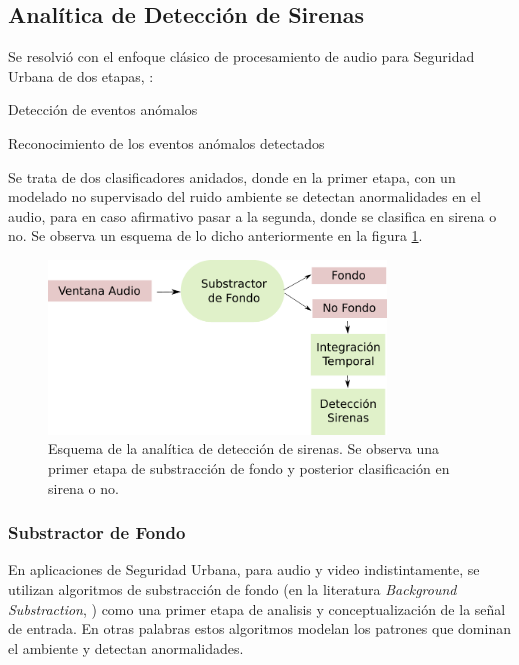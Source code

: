 \documentclass{article}
\begin{document}
\subsection{Analítica de Detección de Sirenas}
Se resolvió con el enfoque clásico de procesamiento de audio para Seguridad Urbana de dos etapas, \cite{lecomte2011abnormal}:
\begin{enumerate}
\begin{item}
Detección de eventos anómalos
\end{item}
\begin{item}
Reconocimiento de los eventos anómalos detectados
\end{item}
\end{enumerate}

Se trata de dos clasificadores anidados, donde en la primer etapa, con un modelado no supervisado del ruido ambiente se detectan anormalidades en el audio, para en caso afirmativo pasar a la segunda, donde se clasifica en sirena o no. Se observa un esquema de lo dicho anteriormente en la figura \ref{fig:deteccion_sirenas}. 
 
\begin{figure}[h]
\begin{center}
\includegraphics[width=0.8\textwidth]{deteccion_sirenas} 
\caption{Esquema de la analítica de detección de sirenas. Se observa una primer etapa de substracción de fondo y posterior clasificación en sirena o no.}
\label{fig:deteccion_sirenas}
\end{center}
\end{figure}

\subsubsection{Substractor de Fondo}
En aplicaciones de Seguridad Urbana, para audio y video indistintamente, se utilizan algoritmos de substracción de fondo (en la literatura \textit{Background Substraction}, \cite{Crocco:2016:ASS:2891449.2871183}) como una primer etapa de analisis y conceptualización de la señal de entrada. En otras palabras estos algoritmos modelan los patrones que dominan el ambiente y detectan anormalidades.
\smallskip 
\end{document}
